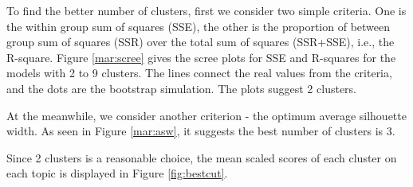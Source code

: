 \documentclass[12pt,nohyper]{tufte-handout}\usepackage[]{graphicx}\usepackage[]{color}
\begin{document}
To find the better number of clusters, first we consider two simple 
criteria. One is the within group sum of squares (SSE), the other is 
the proportion of between group sum of squares (SSR) over the total 
sum of squares (SSR+SSE), i.e., the R-square.
Figure \ref{mar:scree} gives the scree plots for SSE and R-squares
for the models with 2 to 9 clusters. The lines connect 
the real values from the criteria, and the dots are the 
bootstrap simulation. The plots suggest 2 clusters.

At the meanwhile, we consider another criterion - the optimum 
average silhouette width. As seen in Figure \ref{mar:asw}, 
it suggests the best number of clusters is 3.

Since 2 clusters is a reasonable choice,
the mean scaled scores of each cluster on each topic is displayed in 
Figure \ref{fig:bestcut}.
\end{document}

